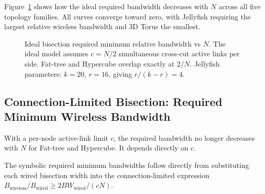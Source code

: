 \documentclass[conference]{IEEEtran}
\begin{document}
Figure~\ref{fig:ideal-bisection} shows how the ideal required bandwidth decreases with \(N\) across all five topology families. All curves converge toward zero, with Jellyfish requiring the largest relative wireless bandwidth and 3D Torus the smallest.

\begin{figure}[!t]
\centering
{}
\caption{Ideal bisection required minimum relative bandwidth vs $N$. The ideal model assumes $c = N/2$ simultaneous cross-cut active links per side. Fat-tree and Hypercube overlap exactly at $2/N$. Jellyfish parameters: $k=20$, $r=16$, giving $r/(k-r)=4$.}
\label{fig:ideal-bisection}
\end{figure}

\subsection{Connection-Limited Bisection: Required Minimum Wireless Bandwidth}

With a per-node active-link limit \(c\), the required bandwidth no longer decreases with \(N\) for Fat-tree and Hypercube. It depends directly on \(c\).

The symbolic required minimum bandwidths follow directly from substituting each wired bisection width into the connection-limited expression \(B_{\mathrm{wireless}}/B_{\mathrm{wired}} \ge 2BW_{\mathrm{wired}}/(cN)\).
\end{document}

